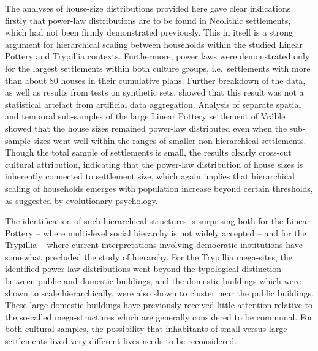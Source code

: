 \documentclass[
  12pt,
  a4paper, twoside]{book}
\begin{document}
The analyses of house-size distributions provided here gave clear indications firstly that power-law distributions are to be found in Neolithic settlements, which had not been firmly demonstrated previously. This in itself is a strong argument for hierarchical scaling between households within the studied Linear Pottery and Trypillia contexts. Furthermore, power laws were demonstrated only for the largest settlements within both culture groups, i.e.~settlements with more than about 80 houses in their cumulative plans. Further breakdown of the data, as well as results from tests on synthetic sets, showed that this result was not a statistical artefact from artificial data aggregation. Analysis of separate spatial and temporal sub-samples of the large Linear Pottery settlement of Vráble showed that the house sizes remained power-law distributed even when the sub-sample sizes went well within the ranges of smaller non-hierarchical settlements. Though the total sample of settlements is small, the results clearly cross-cut cultural attribution, indicating that the power-law distribution of house sizes is inherently connected to settlement size, which again implies that hierarchical scaling of households emerges with population increase beyond certain thresholds, as suggested by evolutionary psychology.

The identification of such hierarchical structures is surprising both for the Linear Pottery -- where multi-level social hierarchy is not widely accepted -- and for the Trypillia -- where current interpretations involving democratic institutions have somewhat precluded the study of hierarchy. For the Trypillia mega-sites, the identified power-law distributions went beyond the typological distinction between public and domestic buildings, and the domestic buildings which were shown to scale hierarchically, were also shown to cluster near the public buildings. These large domestic buildings have previously received little attention relative to the so-called mega-structures which are generally considered to be communal. For both cultural samples, the possibility that inhabitants of small versus large settlements lived very different lives needs to be reconsidered.
\end{document}
